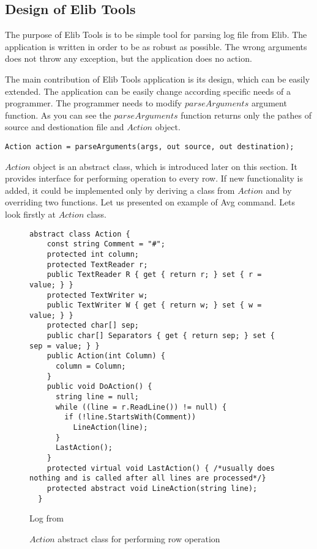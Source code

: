 \subsection*{Design of Elib Tools}
	The purpose of Elib Tools is to be simple tool for parsing log file from Elib.
	The application is written in order to be as robust as possible.
	The wrong arguments does not throw any exception, but the application does no action.

	The main contribution of Elib Tools application is its design, which can be easily extended.
	The application can be easily change according specific needs of a programmer.
	The programmer needs to modify $parseArguments$ argument function.
	As you can see the $parseArguments$ function returns only the pathes of source and destionation file
	and $Action$ object.
\begin{lstlisting}
Action action = parseArguments(args, out source, out destination);
\end{lstlisting}
	
	$Action$ object is an abstract class, which is introduced later on this section. It provides
	interface for performing operation to every row.
	If new functionality is added, it could be implemented only by deriving a class from $Action$ and by overriding
	two functions. Let us presented on example of Avg command. Lets look firstly at $Action$ class.
\begin{figure}[!hbp]
\begin{lstlisting}
abstract class Action {
    const string Comment = "#";
    protected int column;
    protected TextReader r;
    public TextReader R { get { return r; } set { r = value; } }
    protected TextWriter w;
    public TextWriter W { get { return w; } set { w = value; } }
    protected char[] sep;
    public char[] Separators { get { return sep; } set { sep = value; } }
    public Action(int Column) {
      column = Column;
    }
    public void DoAction() {
      string line = null;
      while ((line = r.ReadLine()) != null) {
        if (!line.StartsWith(Comment))
          LineAction(line);
      }
      LastAction();
    }
    protected virtual void LastAction() { /*usually does nothing and is called after all lines are processed*/}
    protected abstract void LineAction(string line);
  }
\end{lstlisting}

	Log from 
\caption{$Action$ abstract class for performing row operation}\label{action}
\end{figure}

